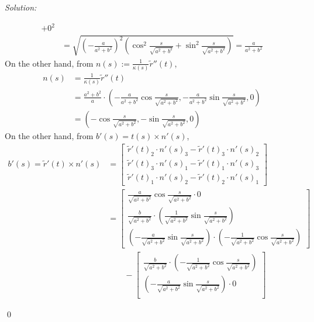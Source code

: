 \documentclass[12pt]{article}
\newenvironment{sol}
{\emph{Solution:}
}
{
    \qed
    }
\begin{document}
\begin{sol}
\begin{align}
{            + 0^2
            } \nonumber \\
        &= \sqrt{
            \left( -\frac{a}{a^2+b^2} \right)^2 
            \left( \cos^2{\frac{s}{\sqrt{a^2+b^2}}} + \sin^2{\frac{s}{\sqrt{a^2+b^2}}} \right)}
             = \frac{a}{a^2+b^2} \nonumber
\end{align}
On the other hand, from $n(s) := \frac{1}{\kappa (s)} \tilde{r}''(t)$,
\begin{align}
    n(s) &= \frac{1}{\kappa (s)} \tilde{r}''(t) \nonumber\\
         &= \frac{a^2+b^2}{a} \cdot \left(-\frac{a}{a^2+b^2} \cos{\frac{s}{\sqrt{a^2+b^2}}}, -\frac{a}{a^2+b^2} \sin{\frac{s}{\sqrt{a^2+b^2}}}, 0 \right) \nonumber\\
         &= \left(-\cos{\frac{s}{\sqrt{a^2+b^2}}}, -\sin{\frac{s}{\sqrt{a^2+b^2}}}, 0 \right) \nonumber
\end{align}
On the other hand, from $b'(s) = t(s) \times n'(s)$,
\begin{align}
    b'(s)=\tilde{r}'(t) \times n'(s)
    &= 
    \begin{bmatrix} 
        \tilde{r}'(t)_2 \cdot n'(s)_3 - \tilde{r}'(t)_3 \cdot n'(s)_2 \\
        \tilde{r}'(t)_3 \cdot n'(s)_1 - \tilde{r}'(t)_1 \cdot n'(s)_3 \\
        \tilde{r}'(t)_1 \cdot n'(s)_2 - \tilde{r}'(t)_2 \cdot n'(s)_1 
    \end{bmatrix} \nonumber \\
    &= 
    \begin{bmatrix}
        \frac{a}{\sqrt{a^2+b^2}} \cos{\frac{s}{\sqrt{a^2+b^2}}}                \cdot 0                                             \\
        \frac{b}{\sqrt{a^2+b^2}}                                               \cdot \left( \frac{1}{\sqrt{a^2+b^2}} \sin{\frac{s}{\sqrt{a^2+b^2}}}\right)  \\
        \left(-\frac{a}{\sqrt{a^2+b^2}} \sin{\frac{s}{\sqrt{a^2+b^2}}} \right) \cdot \left(-\frac{1}{\sqrt{a^2+b^2}} \cos{\frac{s}{\sqrt{a^2+b^2}}}\right)  
    \end{bmatrix} \nonumber \\
    &\qquad-
    \begin{bmatrix}
        \frac{b}{\sqrt{a^2+b^2}}                                               \cdot \left(-\frac{1}{\sqrt{a^2+b^2}} \cos{\frac{s}{\sqrt{a^2+b^2}}}\right) \\
        \left(-\frac{a}{\sqrt{a^2+b^2}} \sin{\frac{s}{\sqrt{a^2+b^2}}} \right) \cdot 0                                            \\

\end{bmatrix}
\end{align}
\end{sol}
\end{document}
